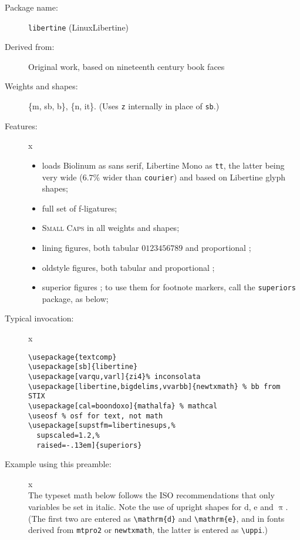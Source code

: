 \documentclass{article}
\def\Pr{\ensuremath{\mathbb{P}}}
\def\d{\mathrm{d}}
\begin{document}
\thispagestyle{empty}
\begin{description}
\item[Package name:] {\tt libertine} (LinuxLibertine)
\item[Derived from:] Original work, based on nineteenth century book faces
\item[Weights and shapes:]  \{m, sb, b\}, \{n, it\}. (Uses {\tt z} internally in place of {\tt sb}.)
\item[Features:]{\color{white}x}\\[-15pt]  
\begin{itemize}
\item loads Biolinum as sans serif, Libertine Mono as {\tt tt}, the latter being very wide ($6.7$\% wider than {\tt courier}) and based on Libertine glyph shapes;
\item
full set of f-ligatures;
\item \textsc{Small Caps} in all weights and shapes;
\item lining figures, both tabular $0123456789$ and proportional {};
\item oldstyle figures, both tabular  and proportional ;
\item superior figures ; to use them for footnote markers, call the {\tt superiors} package, as below;
\end{itemize}
\item[Typical invocation:]{\color{white}x}
\begin{verbatim}
\usepackage{textcomp}
\usepackage[sb]{libertine} 
\usepackage[varqu,varl]{zi4}% inconsolata
\usepackage[libertine,bigdelims,vvarbb]{newtxmath} % bb from STIX
\usepackage[cal=boondoxo]{mathalfa} % mathcal
\useosf % osf for text, not math
\usepackage[supstfm=libertinesups,%
  supscaled=1.2,%
  raised=-.13em]{superiors}
\end{verbatim}
\item[Example using this preamble:]{\color{white}x}\\[6pt]
\lipsum[1]
\def\Pr{\ensuremath{\mathbb{P}}}
\def\d{\mathrm{d}}
The typeset math below follows the ISO recommendations that only variables
be set in italic. Note the use of upright shapes for $\d$, $\mathrm{e}$
and $\uppi$. (The first two are entered as \verb|\mathrm{d}| and
\verb|\mathrm{e}|, and in fonts derived from {\tt mtpro2} or {\tt newtxmath},
 the latter is entered as \verb|\uppi|.)


\end{description}
\end{document}
